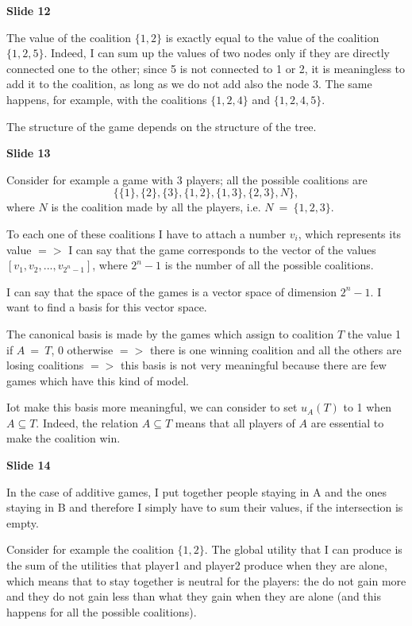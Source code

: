 \documentclass[pt11,a4paper,twoside,reqno,openright]{paper}
\begin{document}
\bigskip
\noindent \textbf{Slide 12}

\noindent The value of the coalition $\{1,2\}$ is exactly equal to the value 
of the coalition $\{1,2,5\}$. Indeed, I can sum up the values of two nodes 
only if they are directly connected one to the other; since 5 is not 
connected to 1 or 2, it is meaningless to add it to the coalition, as long 
as we do not add also the node 3. The same happens, for example, with the 
coalitions $\{1,2,4\}$ and $\{1,2,4,5\}$.

\noindent The structure of the game depends on the structure of the tree.

\bigskip
\noindent \textbf{Slide 13}

\noindent Consider for example a game with 3 players; all the possible 
coalitions are
\[
	\{\{1\}, \{2\}, \{3\}, \{1,2\}, \{1,3\}, \{2,3\}, N\},
\]
where $N$ is the coalition made by all the players, i.e. $N~=~\{1,2,3\}$.

\noindent To each one of these coalitions I have to attach a number $v_i$, 
which represents its value $=>$ I can say that the game corresponds to the 
vector of the values $[v_1, v_2, ..., v_{2^n-1}]$, where $2^n-1$ is the 
number of all the possible coalitions.

\noindent I can say that the space of the games is a vector space of 
dimension $2^n-1$. I want to find a basis for this vector space.

\noindent The canonical basis is made by the games which assign to coalition 
$T$ the value 1 if $A~=~T$, 0 otherwise $=>$ there is one winning coalition 
and all the others are losing coalitions $=>$ this basis is not very 
meaningful because there are few games which have this kind of model.

\noindent Iot make this basis more meaningful, we can consider to set $u_A(T)$ 
to 1 when $A \subseteq T$. Indeed, the relation $A \subseteq T$ means that 
all players of $A$ are essential to make the coalition win. 

\bigskip
\noindent \textbf{Slide 14} 

\noindent In the case of additive games, I put together people staying in A 
and the ones staying in B and therefore I simply have to sum their values, 
if the intersection is empty.

\noindent Consider for example the coalition $\{1,2\}$. The global utility 
that I can produce is the sum of the utilities that player1 and player2 
produce when they are alone, which means that to stay together is neutral 
for the players: the do not gain more and they do not gain less than what 
they gain when they are alone (and this happens for all the possible 
coalitions).
\end{document}
